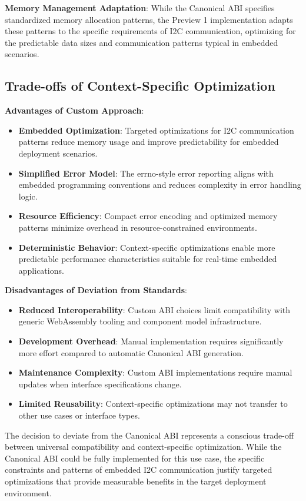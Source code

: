 \textbf{Memory Management Adaptation}: While the Canonical ABI specifies standardized memory allocation patterns, the Preview 1 implementation adapts these patterns to the specific requirements of I2C communication, optimizing for the predictable data sizes and communication patterns typical in embedded scenarios.

\subsection{Trade-offs of Context-Specific Optimization}

\textbf{Advantages of Custom Approach}:
\begin{itemize}
    \item \textbf{Embedded Optimization}: Targeted optimizations for I2C communication patterns reduce memory usage and improve predictability for embedded deployment scenarios.
    \item \textbf{Simplified Error Model}: The errno-style error reporting aligns with embedded programming conventions and reduces complexity in error handling logic.
    \item \textbf{Resource Efficiency}: Compact error encoding and optimized memory patterns minimize overhead in resource-constrained environments.
    \item \textbf{Deterministic Behavior}: Context-specific optimizations enable more predictable performance characteristics suitable for real-time embedded applications.
\end{itemize}

\textbf{Disadvantages of Deviation from Standards}:
\begin{itemize}
    \item \textbf{Reduced Interoperability}: Custom ABI choices limit compatibility with generic WebAssembly tooling and component model infrastructure.
    \item \textbf{Development Overhead}: Manual implementation requires significantly more effort compared to automatic Canonical ABI generation.
    \item \textbf{Maintenance Complexity}: Custom ABI implementations require manual updates when interface specifications change.
    \item \textbf{Limited Reusability}: Context-specific optimizations may not transfer to other use cases or interface types.
\end{itemize}

The decision to deviate from the Canonical ABI represents a conscious trade-off between universal compatibility and context-specific optimization. While the Canonical ABI could be fully implemented for this use case, the specific constraints and patterns of embedded I2C communication justify targeted optimizations that provide measurable benefits in the target deployment environment.


